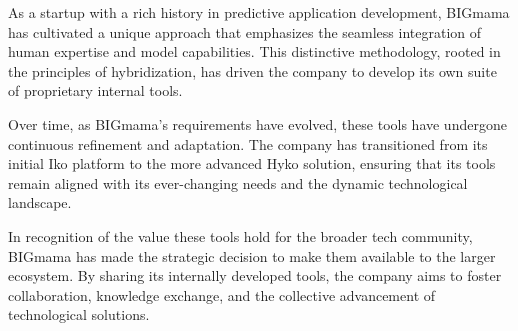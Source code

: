 As a startup with a rich history in predictive application development, BIGmama has cultivated a unique approach that emphasizes the seamless integration of human expertise and model capabilities. This distinctive methodology, rooted in the principles of hybridization, has driven the company to develop its own suite of proprietary internal tools.

Over time, as BIGmama's requirements have evolved, these tools have undergone continuous refinement and adaptation. The company has transitioned from its initial Iko platform to the more advanced Hyko solution, ensuring that its tools remain aligned with its ever-changing needs and the dynamic technological landscape.

In recognition of the value these tools hold for the broader tech community, BIGmama has made the strategic decision to make them available to the larger ecosystem. By sharing its internally developed tools, the company aims to foster collaboration, knowledge exchange, and the collective advancement of technological solutions.
